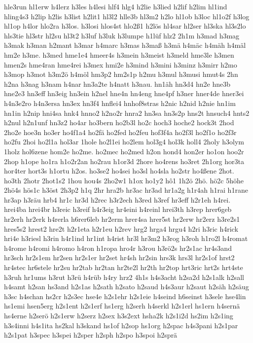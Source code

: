 {hle3run
hl1erw
h4lerz
h3les
h4lesi
hlf4
hlg4
h2lie
h3lied
h2lif
h2lim
hl1ind
hling4s3
h2lip
h2lis
h3list
h2lit1
hl3l2
hlle3b
hl3m2
h2lo
hl1ob
h3loc
hl1o2f
h3log
hl1op
h4lor
hlo2ra
h3los.
h3losi
hlos4st
hlo2ß1
h2lös
hl4sar
hl2ser
hl3ska
hl3s2lo
hls3tie
hl3str
hl2su
hl3t2
h3luf
h3luk
h3lumpe
h1lüf
hlz2
2h1m
h3mad
h3mag
h3mak
h3man
h2mant
h3mar
h4marc
h3mas
h3maß
h3mä
h4mäc
h4mäh
h4mäl
hm2e
h3me.
h3med
hme1e4
hmeer4s
h3mein
h3meist
h3meld
hme3le
h3men
hmen2s
hme4ran
hme4rei
h3mex
hmi2e
h3mind
h3mini
h3minz
h3mirr
h2mo
h3mop
h3mot
h3m2ö
h4möl
hm3p2
hm2s1p
h2mu
h3mul
h3musi
hmut4s
2hn
h2na
h3nag
h3nam
h4nar
hn3a2te
h4natt
h3nau.
hn1äh
hn3d4
hn2e
hne3b
hne2e3
hn3eff
hn3eig
hn3ein
h2nel
hne4n
hn4eng
hne4pf
h3ner
hner4de
hner3ei
h4n3e2ro
h4n3ersa
hn3ex
hn3f4
hnflei4
hnhof8stras
h2nic
h2nid
h2nie
hn1im
hn1in
h2nip
hni4sa
hnk4
hnno2
h2no2r
hnra2
hn3sa
hn3s2p
hns2t
hnsuch4
hnts2
h2nul
h2n1unf
hn3z2
ho4ar
ho3bern
ho2b3l
ho2c
hoch3
hoche2
hock3t
2hod
2ho2e
hoe3n
ho3er
ho4f1a4
ho2fä
ho2fed
ho2feu
hof3f4a
ho2f3l
ho2f1o
ho2f3r
ho2fu
2hoi
ho2l1a
hol3ar
1hole
ho2l1ei
ho2lem
hol3g4
hol3k
holl4
2holy
h3olym
1holz
hol6zene
hom2e
ho2me.
ho2mec
ho2med
h2on
hond4
hon2er
ho1on
hoo2r
2hop
h1ope
ho1ra
h1o2r2an
ho2rau
h1or3d
2hore
ho4rens
ho3ret
2h1org
hor3ta
hor4ter
hort3s
h1ortu
h2os.
ho3se2
ho4sei
ho3sl
ho4sla
ho2str
ho4ßene
2hot.
ho3th
2hotr
2hot1s2
1hou
hou4s
2ho2w1
h1ox
ho1y2
hô1
1h2ö
2hö.
hö2c
5höhe
2hö4s
hös1c
h3öst
2h3p2
h1q
2hr
hra2b
hr3ac
hr3ad
hr1a2g
h1r4ah
h1rai
h1rane
hr3ap
h3räu
hrb4
hr1c
hr3d
h2rec
h3r2ech
h3red
h3ref
hr3eff
h2r1eh
h4rei.
hrei4ba
hrei4br
h3reic
h3reif
h4r3eig
hr4eini
h4reinl
hrei3th
h3rep
hrer6geb
hr2erh
hr2erk
h4rerla
h6rer6leb
hr2erm
hrer4sa
hrer5st
hr2erw
hr2erz
h3re2s1
hres5s2
hrest2
hre2t
h2r1eta
h2r1eu
h2rev
hrg2
hrga4
hrgu4
h2ri
h3ric
h4rick
hri4e
h3riesl
h3rin
h4r1ind
hr1int
h4rist
hr3l
hr3m2
h3rog
h3roh
h1ro2l
h4romat
h4rome
h4romi
h4romo
h4ron
h1ropa
hro4r
h3rou
h3rö2s
hr2s1ac
hr4s3and
hr3sch
hr2s1em
hr2sen
hr2s1er
hr2set
hr4sh
hr2sin
hrs3k
hrs3l
hr2s1of
hrst2
hr4stec
hr6stele
hr2su
hr2tab
hr2tan
hr2te2l
hr2th
hr2top
hrt3ric
hrt2s
hrt4ste
h3ruh
hr1ums
h3rut
h3rü
h4rüb
h4ry
hrz2
4h1s
h4s3acht
h2sa2d
h2s1alk
h2sall
h4samt
h2san
hs3and
h2s1as
h2sath
h2sato
h2saud
h4s3aur
h2saut
h2säh
h2säug
h3sc
h4schan
hs2cr
h2s3ec
hse4e
h2s1ehr
h2s1eie
h4seind
h6seinst
h3sele
hse4lin
hs1emi
hsen5erg
h2s1ent
h2s1erf
hs1erg
h2serh
h4serkl
h2s1erl
hs1ern
h4sernä
hs4erne
h2serö
h2s1erw
h2serz
h2sex
h3s2ext
hsha2k
h2s1i2d
hs2im
h2s1ing
h3s4inni
h4s1ita
hs2kal
h3skand
hs1of
h2sop
hs1org
h2spac
h4s3pani
h2s1par
h2s1pat
h3spec
h3spei
h2sper
h2sph
h2spo
h3spoi
h2sprä
}
